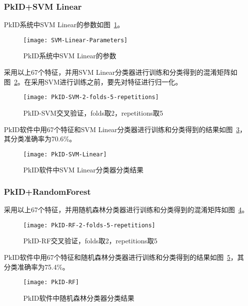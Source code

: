 \subsubsection{PkID+SVM Linear}
PkID系统中SVM Linear的参数如图~\ref{fig:SVM-Linear-Parameters}。
\begin{figure}[!ht]
\centering
\texttt{[image: SVM-Linear-Parameters]}
\caption{PkID系统中SVM Linear的参数}
\label{fig:SVM-Linear-Parameters}
\end{figure}

采用以上67个特征，并用SVM Linear分类器进行训练和分类得到的混淆矩阵如图~\ref{fig: PkID-SVM-2-folds-5-repetitions}。在采用SVM进行训练之前，要先对特征进行归一化。
\begin{figure}[!ht]
\centering
\texttt{[image: PkID-SVM-2-folds-5-repetitions]}
\caption{PkID-SVM交叉验证，folds取2，repetitions取5}
\label{fig: PkID-SVM-2-folds-5-repetitions}
\end{figure}

PkID软件中用67个特征和SVM Linear分类器进行训练和分类得到的结果如图~\ref{fig:PkID-SVM-Linear}，其分类准确率为70.6\%。
\begin{figure}[!ht]
\centering
\texttt{[image: PkID-SVM-Linear]}
\caption{PkID软件中SVM Linear分类器分类结果}
\label{fig:PkID-SVM-Linear}
\end{figure}

\subsubsection{PkID+RandomForest}
采用以上67个特征，并用随机森林分类器进行训练和分类得到的混淆矩阵如图~\ref{fig: PkID-RF-2-folds-5-repetitions}。

\begin{figure}[!ht]
\centering
\texttt{[image: PkID-RF-2-folds-5-repetitions]}
\caption{PkID-RF交叉验证，folds取2，repetitions取5}
\label{fig: PkID-RF-2-folds-5-repetitions}
\end{figure}

PkID软件中用67个特征和随机森林分类器进行训练和分类得到的结果如图~\ref{fig:PkID-RF}，其分类准确率为75.4\%。

\begin{figure}[!ht]
\centering
\texttt{[image: PkID-RF]}
\caption{PkID软件中随机森林分类器分类结果}
\label{fig:PkID-RF}
\end{figure}







